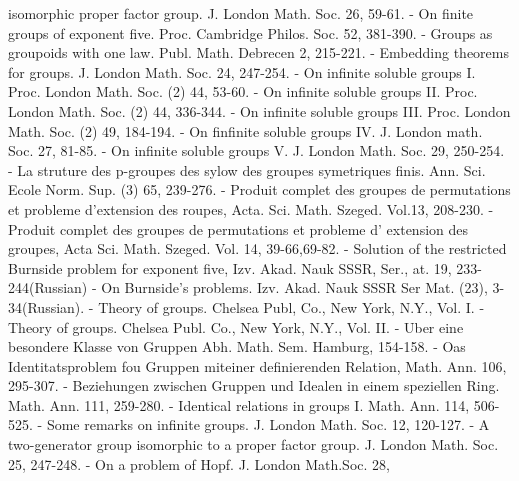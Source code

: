 \begin{thebibliography}{99}
  isomorphic proper factor group. J. London Math. Soc. 26, 59-61. 
- On finite groups of exponent
  five. Proc. Cambridge Philos. Soc. 52, 381-390. 
- Groups as groupoids
  with one law. Publ. Math. Debrecen 2, 215-221. 
-
  Embedding theorems for groups. J. London Math. Soc. 24, 247-254. 
- On infinite soluble groups
  I. Proc. London Math. Soc. (2) 44, 53-60. 
- On infinite soluble groups II. Proc. London
  Math. Soc. (2) 44, 336-344. 
- On infinite soluble groups III. Proc. London
  Math. Soc. (2) 49, 184-194. 
- On finfinite soluble groups IV. J. London
  math. Soc. 27, 81-85. 
- On infinite soluble groups V. J. London
  Math. Soc. 29, 250-254. 
- La struture des p-groupes des sylow
  des groupes symetriques finis. Ann. Sci. Ecole Norm. Sup. (3) 65,
  239-276. 
- Produit complet
  des groupes de permutations et probleme d'extension des roupes,
  Acta. Sci. Math. Szeged. Vol.13, 208-230. 
 - Produit complet des groupes de permutations et
  probleme d' extension des groupes, Acta Sci. Math. Szeged. Vol. 14,
  39-66,69-82. 
- Solution of the restricted
  Burnside problem for exponent five, Izv. Akad. Nauk SSSR,
  Ser., at. 19, 233-244(Russian) 
- On Burnside's problems. Izv. Akad. Nauk SSSR
  Ser Mat. (23), 3-34(Russian). 
- Theory of groups. Chelsea Publ, Co.,
  New York, N.Y., Vol. I. 
- Theory of groups. Chelsea Publ. Co., New York,
  N.Y., Vol. II. 
- Uber eine
  besondere Klasse von Gruppen Abh. Math. Sem. Hamburg, 154-158. 
- Oas Identitatsproblem fou Gruppen
  miteiner definierenden Relation, Math. Ann. 106, 295-307. 
 - Beziehungen zwischen Gruppen und Idealen in
  einem speziellen Ring. Math. Ann. 111, 259-280. 
- Identical relations in groups
  I. Math. Ann. 114, 506-525. 
- Some remarks on infinite groups. J. London
  Math. Soc. 12, 120-127. 
- A two-generator group isomorphic to a proper
  factor group. J. London Math. Soc. 25, 247-248. 
- On a problem of Hopf. J. London Math.Soc. 28,

\end{thebibliography}
